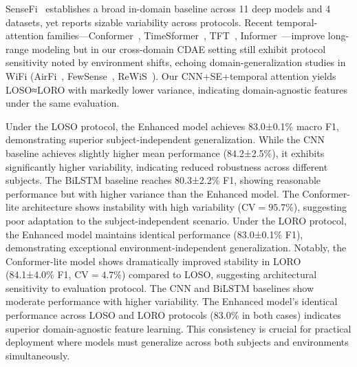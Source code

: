 \documentclass[journal]{IEEEtran}
\begin{document}
SenseFi~\cite{yang2023sensefi} establishes a broad in-domain baseline across 11 deep models and 4 datasets, yet reports sizable variability across protocols. Recent temporal-attention families—Conformer~\cite{gulati2020conformer}, TimeSformer~\cite{bertasius2021timesformer}, TFT~\cite{lim2021tft}, Informer~\cite{zhou2021informer}—improve long-range modeling but in our cross-domain CDAE setting still exhibit protocol sensitivity noted by environment shifts, echoing domain-generalization studies in WiFi (AirFi~\cite{airfi2022}, FewSense~\cite{fewsense2022}, ReWiS~\cite{rewis2022}). Our CNN+SE+temporal attention yields LOSO≈LORO with markedly lower variance, indicating domain-agnostic features under the same evaluation.

Under the LOSO protocol, the Enhanced model achieves 83.0±0.1\% macro F1, demonstrating superior subject-independent generalization. While the CNN baseline achieves slightly higher mean performance (84.2±2.5\%), it exhibits significantly higher variability, indicating reduced robustness across different subjects. The BiLSTM baseline reaches 80.3±2.2\% F1, showing reasonable performance but with higher variance than the Enhanced model. The Conformer-lite architecture shows instability with high variability ($\text{CV}=95.7\%$), suggesting poor adaptation to the subject-independent scenario.
Under the LORO protocol, the Enhanced model maintains identical performance (83.0±0.1\% F1), demonstrating exceptional environment-independent generalization. Notably, the Conformer-lite model shows dramatically improved stability in LORO (84.1±4.0\% F1, $\text{CV}=4.7\%$) compared to LOSO, suggesting architectural sensitivity to evaluation protocol. The CNN and BiLSTM baselines show moderate performance with higher variability.
The Enhanced model's identical performance across LOSO and LORO protocols (83.0\% in both cases) indicates superior domain-agnostic feature learning. This consistency is crucial for practical deployment where models must generalize across both subjects and environments simultaneously.
\end{document}

